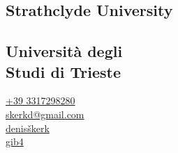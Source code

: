\documentclass{dske-resume-openfont}
\begin{document}
%
%

\pageborder


%
%
\lastupdated{}


%
%

\begin{minipage}[t]{0.31\textwidth} 


{\fontsize{\the\leftColumnFont}{\the\leftColumnLineSpace}\selectfont
{\fontsize{\the\leftSubsectionSize}{\the\leftSubsectionLineSpace}\selectfont\subsection{Strathclyde University}}
{\fontsize{\the\leftColumnFont}{\the\leftColumnLineSpace}\selectfont
{}}
\vspace{\leftSmallGap}

{\fontsize{\the\leftSubsectionSize}{\the\leftSubsectionLineSpace}\selectfont\subsection{\texorpdfstring{Universit\`{a} degli\\ Studi di Trieste}{Universita degli Studi di Trieste}}}
{\fontsize{\the\leftColumnFont}{\the\leftColumnLineSpace}\selectfont
{}}
}


{\fontsize{\the\leftContactFontSize}{\the\leftContactLineSpace}\selectfont
{\color{iconcolor}\faPhone}\hspace{\leftContactIconSpace} \href{tel:+393317298280}{+39 3317298280} \\[0.3em]
{\color{iconcolor}\faEnvelope}\hspace{\leftContactIconSpace} \href{mailto:skerkd@gmail.com}{skerkd@gmail.com} \\[0.3em]
{\color{iconcolor}\faLinkedin}\hspace{\leftContactIconSpace} \href{https://www.linkedin.com/in/denis-\%C5\%A1kerk/}{denisškerk} \\[0.3em]
{\color{iconcolor}\faGithub}\hspace{\leftContactIconSpace} \href{https://github.com/gib4}{gib4}}


\end{minipage}
\end{document}
